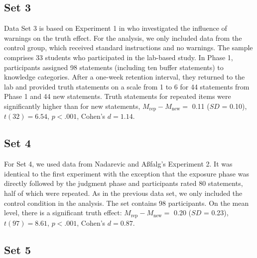 \documentclass[
  english,
  ,man,floatsintext]{apa6}
\begin{document}
\begin{appendix}
\hypertarget{set-3}{%
\subsection{Set 3}\label{set-3}}

Data Set 3 is based on Experiment 1 in \textcite{nadarevic2017} who
investigated the influence of warnings on the truth effect. For the
analysis, we only included data from the control group, which received
standard instructions and no warnings. The sample comprises 33 students
who participated in the lab-based study. In Phase 1, participants
assigned 98 statements (including ten buffer statements) to knowledge
categories. After a one-week retention interval, they returned to the
lab and provided truth statements on a scale from 1 to 6 for 44
statements from Phase 1 and 44 new statements. Truth statements for
repeated items were significantly higher than for new statements,
\(M_\text{rep} - M_\text{new} =\) 0.11 (\(SD\) = 0.10),
\(t(32) = 6.54\), \(p < .001\), Cohen's \(d = 1.14\).

\hypertarget{set-4}{%
\subsection{Set 4}\label{set-4}}

For Set 4, we used data from Nadarevic and A\ss falg's
\autocite*{nadarevic2017} Experiment 2. It was identical to the first
experiment with the exception that the exposure phase was directly
followed by the judgment phase and participants rated 80 statements,
half of which were repeated. As in the previous data set, we only
included the control condition in the analysis. The set contains 98
participants. On the mean level, there is a significant truth effect:
\(M_\text{rep} - M_\text{new} =\) 0.20 (\(SD\) = 0.23),
\(t(97) = 8.61\), \(p < .001\), Cohen's \(d = 0.87\).

\hypertarget{set-5}{%
\subsection{Set 5}\label{set-5}}


\end{appendix}
\end{document}
